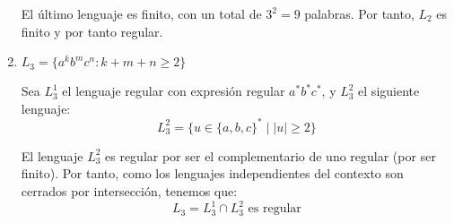 \documentclass[12pt]{article}
\begin{document}
\begin{ejercicio}[2.5 puntos]
\begin{enumerate}
            El último lenguaje es finito, con un total de $3^2 = 9$ palabras. Por tanto, $L_2$ es finito y por tanto regular.
            \item $L_3 = \{a^k b^m c^n : k + m + n \geq 2\}$
            
            Sea $L_3^1$ el lenguaje regular con expresión regular $a^* b^* c^*$, y $L_3^2$ el siguiente lenguaje:
            \begin{equation*}
                L_3^2 = \{u \in \{a,b,c\}^* \mid |u| \geq 2\}
            \end{equation*}

            El lenguaje $L_3^2$ es regular por ser el complementario de uno regular (por ser finito). Por tanto, como los lenguajes independientes del contexto son cerrados por intersección, tenemos que:
            \begin{equation*}
                L_3 = L_3^1 \cap L_3^2 \text{ es regular}
            \end{equation*}
        \end{enumerate}
    \end{ejercicio}
\end{document}

